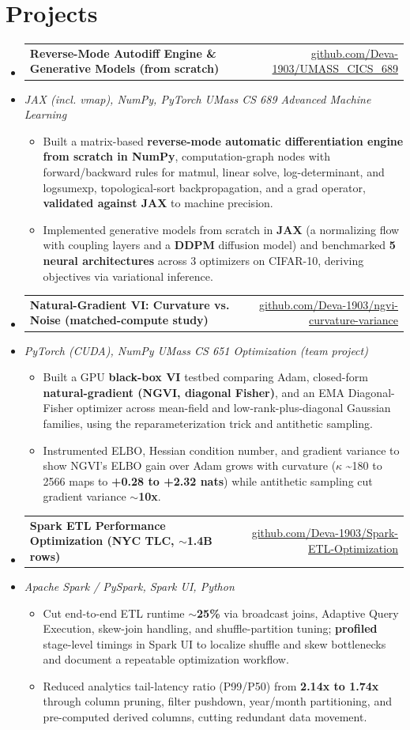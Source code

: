 \documentclass[letterpaper,10pt]{article}
\makeatletter
\newcommand{\resumeItem}[1]{
  \item\small{#1\vspace{-1pt}}
}
\newcommand{\resumeProjectHeading}[2]{
    \item
    \begin{tabular*}{0.985\textwidth}[t]{l@{\extracolsep{\fill}}r}
      \small\textbf{#1} & \small #2 \\
    \end{tabular*}\vspace{-5pt}
}
\newcommand{\resumeProjectSubheading}[1]{
  \vspace{-2pt}\item[] {\small\textcolor{ResumeSlate}{\emph{#1}}}\vspace{-3pt}
}
\newcommand{\resumeSubHeadingListStart}{\begin{itemize}[leftmargin=0.0in, label={}, itemsep=2pt, topsep=2pt]}
\newcommand{\resumeSubHeadingListEnd}{\end{itemize}}
\newcommand{\resumeItemListStart}{\begin{itemize}[leftmargin=0.18in, itemsep=2pt, topsep=1pt]}
\newcommand{\resumeItemListEnd}{\end{itemize}\vspace{-4pt}}
\makeatother
\begin{document}
\section{Projects}
\resumeSubHeadingListStart
  \resumeProjectHeading
    {Reverse-Mode Autodiff Engine \& Generative Models (from scratch)}
    {\href{https://github.com/Deva-1903/UMASS_CICS_689}{github.com/Deva-1903/UMASS\_CICS\_689}}
  \resumeProjectSubheading{JAX (incl. vmap), NumPy, PyTorch \enspace\textbar\enspace UMass CS 689 Advanced Machine Learning}
    \resumeItemListStart
      \resumeItem{Built a matrix-based \textbf{reverse-mode automatic differentiation engine from scratch in NumPy}, computation-graph nodes with forward/backward rules for matmul, linear solve, log-determinant, and logsumexp, topological-sort backpropagation, and a grad operator, \textbf{validated against JAX} to machine precision.}
      \resumeItem{Implemented generative models from scratch in \textbf{JAX} (a normalizing flow with coupling layers and a \textbf{DDPM} diffusion model) and benchmarked \textbf{5 neural architectures} across 3 optimizers on CIFAR-10, deriving objectives via variational inference.}
    \resumeItemListEnd
  \resumeProjectHeading
    {Natural-Gradient VI: Curvature vs. Noise (matched-compute study)}
    {\href{https://github.com/Deva-1903/ngvi-curvature-variance}{github.com/Deva-1903/ngvi-curvature-variance}}
  \resumeProjectSubheading{PyTorch (CUDA), NumPy \enspace\textbar\enspace UMass CS 651 Optimization (team project)}
    \resumeItemListStart
      \resumeItem{Built a GPU \textbf{black-box VI} testbed comparing Adam, closed-form \textbf{natural-gradient (NGVI, diagonal Fisher)}, and an EMA Diagonal-Fisher optimizer across mean-field and low-rank-plus-diagonal Gaussian families, using the reparameterization trick and antithetic sampling.}
      \resumeItem{Instrumented ELBO, Hessian condition number, and gradient variance to show NGVI's ELBO gain over Adam grows with curvature ($\kappa$ \textasciitilde180 to 2566 maps to \textbf{+0.28 to +2.32 nats}) while antithetic sampling cut gradient variance \textbf{$\sim$10x}.}
    \resumeItemListEnd
  \resumeProjectHeading
    {Spark ETL Performance Optimization (NYC TLC, $\sim$1.4B rows)}
    {\href{https://github.com/Deva-1903/Spark-ETL-Optimization}{github.com/Deva-1903/Spark-ETL-Optimization}}
  \resumeProjectSubheading{Apache Spark / PySpark, Spark UI, Python}
    \resumeItemListStart
      \resumeItem{Cut end-to-end ETL runtime \textbf{$\sim$25\%} via broadcast joins, Adaptive Query Execution, skew-join handling, and shuffle-partition tuning; \textbf{profiled} stage-level timings in Spark UI to localize shuffle and skew bottlenecks and document a repeatable optimization workflow.}
      \resumeItem{Reduced analytics tail-latency ratio (P99/P50) from \textbf{2.14x to 1.74x} through column pruning, filter pushdown, year/month partitioning, and pre-computed derived columns, cutting redundant data movement.}
    \resumeItemListEnd
\resumeSubHeadingListEnd
\vspace{-4pt}
\end{document}
